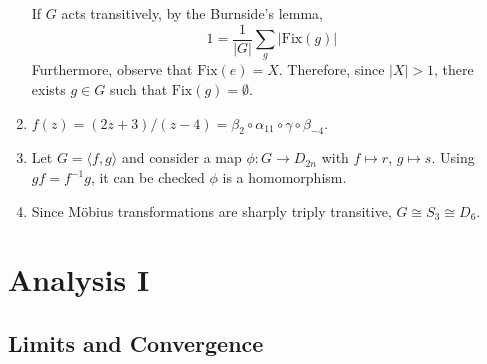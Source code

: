 \documentclass[10pt, a4paper, twoside]{report}
\begin{document}
\begin{enumerate}[{1.}]
    If \(G\) acts transitively, by the Burnside's lemma,
    \[1=\frac 1{|G|}\sum_g|\text{Fix}(g)|\]
    Furthermore, observe that \(\text{Fix}(e)=X\).
    Therefore, since \(|X|>1\), there exists \(g\in G\) such that \(\text{Fix}(g)=\emptyset\).
    \item  \(f(z)=(2z+3)/(z-4)=\beta_2\circ\alpha_{11}\circ\gamma\circ\beta_{-4}\).
    \item Let \(G=\langle f,g\rangle\) and consider a map \(\phi: G\to D_{2n}\) with \(f\mapsto r\), \(g\mapsto s\). Using \(gf=f^{-1}g\), it can be checked \(\phi\) is a homomorphism.
    \item Since Möbius transformations are sharply triply transitive, \(G\cong S_3\cong D_6\).
\end{enumerate}
\chapter{Analysis I}
\section{Limits and Convergence}
\end{document}
